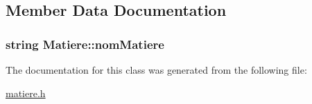 \subsection{Member Data Documentation}
\hypertarget{class_matiere_a701728c9283e82fd270a91a8eb541917}{
\subsubsection[{nom\+Matiere}]{\setlength{\rightskip}{0pt plus 5cm}string Matiere\+::nom\+Matiere\hspace{0.3cm}{\ttfamily [private]}}}\label{class_matiere_a701728c9283e82fd270a91a8eb541917}


The documentation for this class was generated from the following file\+:\begin{DoxyCompactItemize}
\item 
\hyperlink{matiere_8h}{matiere.\+h}\end{DoxyCompactItemize}

